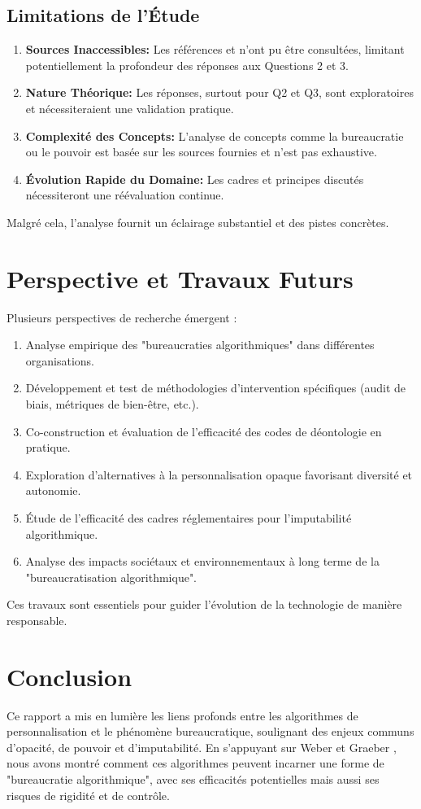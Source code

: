 \documentclass[11pt,a4paper]{article}
\begin{document}
\subsection{Limitations de l'Étude}
\begin{enumerate}
    \item \textbf{Sources Inaccessibles:} Les références \cite{PraxisInaccessible} et \cite{Neuer2018Inaccessible} n'ont pu être consultées, limitant potentiellement la profondeur des réponses aux Questions 2 et 3.
    \item \textbf{Nature Théorique:} Les réponses, surtout pour Q2 et Q3, sont exploratoires et nécessiteraient une validation pratique.
    \item \textbf{Complexité des Concepts:} L'analyse de concepts comme la bureaucratie ou le pouvoir est basée sur les sources fournies et n'est pas exhaustive.
    \item \textbf{Évolution Rapide du Domaine:} Les cadres et principes discutés nécessiteront une réévaluation continue.
\end{enumerate}
Malgré cela, l'analyse fournit un éclairage substantiel et des pistes concrètes.

\section{Perspective et Travaux Futurs}
Plusieurs perspectives de recherche émergent :
\begin{enumerate}
    \item Analyse empirique des "bureaucraties algorithmiques" dans différentes organisations.
    \item Développement et test de méthodologies d'intervention spécifiques (audit de biais, métriques de bien-être, etc.).
    \item Co-construction et évaluation de l'efficacité des codes de déontologie en pratique.
    \item Exploration d'alternatives à la personnalisation opaque favorisant diversité et autonomie.
    \item Étude de l'efficacité des cadres réglementaires pour l'imputabilité algorithmique.
    \item Analyse des impacts sociétaux et environnementaux à long terme de la "bureaucratisation algorithmique".
\end{enumerate}
Ces travaux sont essentiels pour guider l'évolution de la technologie de manière responsable.

\section{Conclusion}
Ce rapport a mis en lumière les liens profonds entre les algorithmes de personnalisation et le phénomène bureaucratique, soulignant des enjeux communs d'opacité, de pouvoir et d'imputabilité. En s'appuyant sur Weber \cite{SerpaFerreira2019} et Graeber \cite{Graeber2015}, nous avons montré comment ces algorithmes peuvent incarner une forme de "bureaucratie algorithmique", avec ses efficacités potentielles mais aussi ses risques de rigidité et de contrôle.
\end{document}
